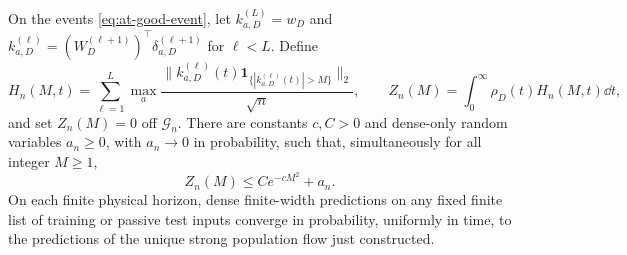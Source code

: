 \begin{lemma}
\label{lem:at-gaussian-tail}
On the events \eqref{eq:at-good-event}, let
$k_{a,D}^{(L)}=w_D$ and
$k_{a,D}^{(\ell)}=(W_D^{(\ell+1)})^\top\delta_{a,D}^{(\ell+1)}$
for $\ell<L$.  Define
\[
 H_n(M,t)=\sum_{\ell=1}^L\max_a
       \frac{\|k_{a,D}^{(\ell)}(t)
           \mathbf1_{\{|k_{a,D}^{(\ell)}(t)|>M\}}\|_2}{\sqrt n},
 \qquad Z_n(M)=\int_0^\infty\rho_D(t)H_n(M,t)\dd t,
\]
and set $Z_n(M)=0$ off $\mathcal G_n$.  There are constants $c,C>0$
and dense-only random variables $a_n\ge0$, with $a_n\to0$ in
probability, such that, simultaneously for all integer $M\ge1$,
\begin{equation}
 Z_n(M)\le Ce^{-cM^2}+a_n.
 \label{eq:at-dense-tail}
\end{equation}
On each finite physical horizon, dense finite-width predictions on any
fixed finite list of training or passive test inputs converge in probability,
uniformly in time, to the predictions of the unique strong population
flow just constructed.
\end{lemma}
